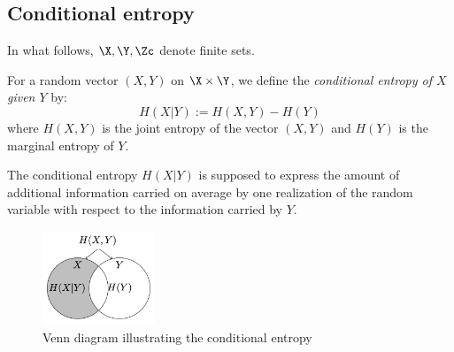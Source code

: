 \documentclass[toc, titlepaged]{../cs-classes/cs-classes}
\begin{document}
\subsection{Conditional entropy}
In what follows, $\X, \Y, \Zc$ denote finite sets.

\begin{definition}
    For a random vector $(X, Y)$ on $\X\times\Y$, we define the \emph{conditional entropy of $X$ given $Y$} by:
    \begin{equation}
        \boxed{H(X|Y) := H(X, Y)-H(Y)}
    \end{equation}
    where $H(X, Y)$ is the joint entropy of the vector $(X, Y)$ and $H(Y)$ is the marginal entropy of $Y$.
\end{definition}

The conditional entropy $H(X|Y)$ is supposed to express the amount of additional information carried on average by one realization of the random variable with respect to the information carried by $Y$.
\begin{figure}[H]
    \centering
    \includegraphics[width=0.3\textwidth]{images/conditional-entropy.png}
    \caption{Venn diagram illustrating the conditional entropy}
\end{figure}
\end{document}
